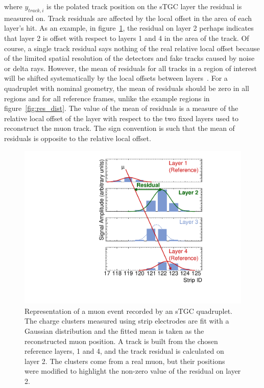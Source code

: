 where $y_{track, i}$ is the polated track position on the sTGC layer the residual is measured on. Track residuals are affected by the local offset in the area of each layer's hit. As an example, in figure~\ref{fig:fake_event_display}, the residual on layer 2 perhaps indicates that layer 2 is offset with respect to layers 1 and 4 in the area of the track. Of course, a single track residual says nothing of the real relative local offset because of the limited spatial resolution of the detectors and fake tracks caused by noise or delta rays. However, the mean of residuals for all tracks in a region of interest will be shifted systematically by the local offsets between layers~\cite{lefebvre_thesis}. For a quadruplet with nominal geometry, the mean of residuals should be zero in all regions and for all reference frames, unlike the example regions in figure~\ref{fig:res_dist}. The value of the mean of residuals is a measure of the relative local offset of the layer with respect to the two fixed layers used to reconstruct the muon track. The sign convention is such that the mean of residuals is opposite to the relative local offset.

\begin{figure}
    \centering
    \includegraphics[width = \textwidth]{figures/figure_fake_event_display.pdf}
    \caption{Representation of a muon event recorded by an sTGC quadruplet. The charge clusters measured using strip electrodes are fit with a Gaussian distribution and the fitted mean is taken as the reconstructed muon position. A track is built from the chosen reference layers, 1 and 4, and the track residual is calculated on layer 2. The clusters come from a real muon, but their positions were modified to highlight the non-zero value of the residual on layer 2.}
    \label{fig:fake_event_display}
\end{figure}


